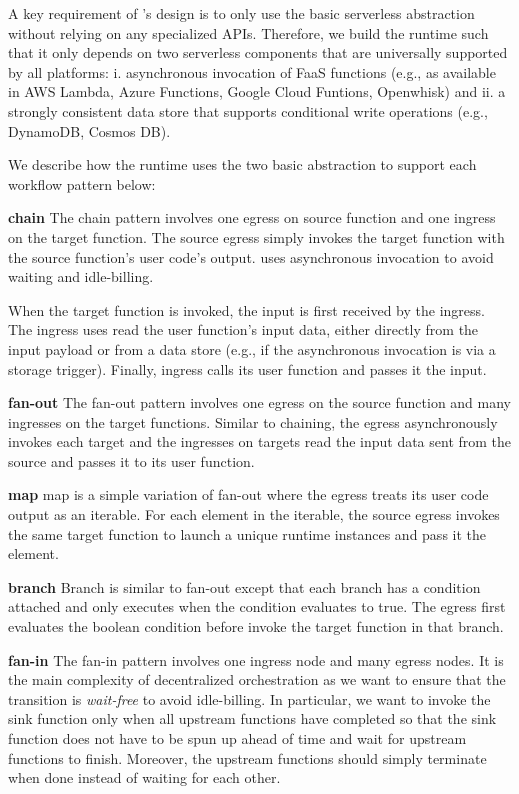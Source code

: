 A key requirement of \name{}'s design is to only use the basic serverless
abstraction without relying on any specialized APIs. Therefore, we build the
runtime such that it only depends on two serverless components that are
universally supported by all platforms: i.
asynchronous invocation of FaaS functions (e.g., as available in AWS Lambda, Azure Functions,
Google Cloud Funtions, Openwhisk) and ii. a strongly consistent data store
that supports conditional write operations (e.g., DynamoDB, Cosmos DB).

We describe how the \name{} runtime uses the two basic abstraction to support
each workflow pattern below:

\noindent\textbf{chain} 
The chain pattern involves one egress on source function and one ingress on
the target function. The source egress simply invokes the target function with
the source function's user code's output. \name{} uses asynchronous invocation
to avoid waiting and idle-billing.

When the target function is invoked, the input is first received by the
\name{} ingress. The ingress uses read the user function's input data, either
directly from the input payload or from a data store (e.g., if the
asynchronous invocation is via a storage trigger). Finally, ingress calls its
user function and passes it the input.

\noindent\textbf{fan-out}
The fan-out pattern involves one egress on the source function and many
ingresses on the target functions.
Similar to chaining, the egress asynchronously invokes each target and the
ingresses on targets read the input data sent from the source and passes it to
its user function.

\noindent\textbf{map}
map is a simple variation of fan-out where the egress treats its user code
output as an iterable. For each element in the iterable, the source egress
invokes the same target function to launch a unique runtime instances and pass
it the element.

\noindent\textbf{branch}
Branch is similar to fan-out except that each branch has a condition attached
and only executes when the condition evaluates to true. The egress first
evaluates the boolean condition before invoke the target function in that
branch. 

\textbf{fan-in}
The fan-in pattern involves one ingress node and many egress nodes.
It is the main complexity of decentralized orchestration as we want to ensure
that the transition is \emph{wait-free} to avoid idle-billing. In particular,
we want to invoke the sink function only when all upstream functions have
completed so that the sink function does not have to be spun up ahead of time and
wait for upstream functions to finish. Moreover, the upstream functions should
simply terminate when done instead of waiting for each other.

